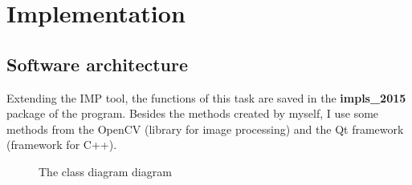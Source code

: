  \chapter{Implementation}
\section{Software architecture}
Extending the IMP tool, the functions of this task are saved in the \textbf{impls\_2015} package of the program. Besides the methods created by myself, I use some methods from the OpenCV (library for image processing) and the Qt framework (framework for C++).\\[0.2cm]
\begin{figure}[p]
    \vspace*{-3cm}
    \caption{The class diagram diagram}
    \label{fig:cdiagram}
\end{figure}
